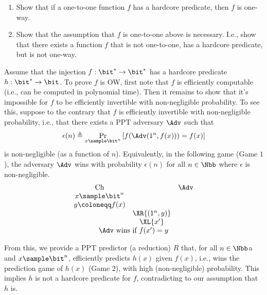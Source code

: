 \begin{problem}\label{p4}
\leavevmode\par
\begin{enumerate}[label=(\roman*)]
    \item Show that if a one-to-one function $f$ has a hardcore predicate, then $f$ is one-way.
    \item Show that the assumption that $f$ is one-to-one above is necessary. I.e., show that
there exists a function $f$ that is not one-to-one, has a hardcore predicate, but is not one-way.
\end{enumerate}
\end{problem}

\begin{answer}[i]
Assume that the injection $f:\bit^\ast\to \bit^\ast$ has a hardcore predicate $h:\bit^\ast\to \bit$.
To prove $f$ is OW, first note that $f$ is efficiently computable (i.e., can be computed in polynomial time). Then it remains to show that it's impossible for $f$ to be efficiently invertible with non-negligible probability. To see this, suppose to the contrary that $f$ is efficiently invertible with non-negligible probability, i.e., that there exists a PPT adversary $\Adv$ such that
\begin{equation}\label{eq:p4-1-1}
    \epsilon(n) \triangleq \Pr_{x\sample \bit^n}\left[ f(\Adv(1^n, f(x)))= f(x) \right]
\end{equation}
is non-negligible (as a function of $n$). Equivalently, in the following game (Game $1$), the adversary $\Adv$ wins with probability $\epsilon(n)$ for all $n\in\Nbb$ where $\epsilon$ is non-negligible.
{
    \[
        \begin{array}{@{} c c c @{}}
        \text{Ch} & & \Adv \\
        x\sample \bit^n & & \\
        y\coloneqq f(x) & & \\
        & \XR{(1^n, y)} & \\
        & \XL{x'} & \\
        \multicolumn{3}{c}{\text{$\Adv$ wins if $f(x') = y$}}
        \end{array}
    \]
    \label{fig:p4-game1}
}

From this, we provide a PPT predictor (a reduction) $R$ that, for all $n\in\Nbb$a and $x\sample \bit^n$, efficiently predicts $h(x)$ given $f(x)$, i.e., wins the prediction game of $h(x)$ (Game $2$), with high (non-negligible) probability. This implies $h$ is not a hardcore predicate for $f$, contradicting to our assumption that $h$ is.


\end{answer}
